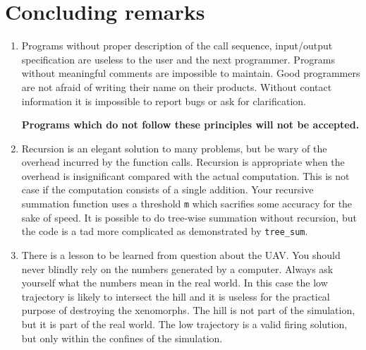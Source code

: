\documentclass[a4paper,12pt]{article}
\newcounter{problem}
\newcounter{remark}
\newcounter{lesson}
\begin{document}
\section{Concluding remarks}

\begin{enumerate}

\item Programs without proper description of the call sequence, input/output specification are useless to the user and the next programmer. Programs without meaningful comments are impossible to maintain. Good programmers are not afraid of writing their name on their products. Without contact information it is impossible to report bugs or ask for clarification.
  \begin{center}
    {\bf Programs which do not follow these principles will not be accepted.}
  \end{center}

\item Recursion is an elegant solution to many problems, but be wary of the overhead incurred by the function calls. Recursion is appropriate when the overhead is insignificant compared with the actual computation. This is not case if the computation consists of a single addition. Your recursive summation function uses a threshold {\tt m} which sacrifies some accuracy for the sake of speed. It is possible to do tree-wise summation without recursion, but the code is a tad more complicated as demonstrated by {\tt tree\_sum}.

\item There is a lesson to be learned from question about the UAV. You should never blindly rely on the numbers generated by a computer. Always ask yourself what the numbers mean in the real world. In this case the low trajectory is likely to intersect the hill and it is useless for the practical purpose of destroying the xenomorphs. The hill is not part of the simulation, but it is part of the real world. The low trajectory is a valid firing solution, but only within the confines of the simulation.

\end{enumerate}


  
  
\end{document}

